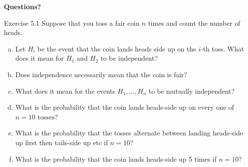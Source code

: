 \documentclass[aspectratio=169,xcolor=pdftex,dvipsnames,table]{beamer}\usepackage[]{graphicx}\usepackage[]{xcolor}
\begin{document}
\begin{frame}
  \begin{center}
    \Large{\textbf{Questions?}}
  \end{center}
\end{frame}

\begin{frame}{Exercise 5.1}
  Suppose that you toss a fair coin $n$ times and count the number of heads.

  \medskip

  \begin{enumerate}[a)]
  \item Let $H_i$ be the event that the coin lands heads side up on the $i$-th toss. What does it mean for $H_1$ and $H_2$ to be independent?
  \item Does independence necessarily mean that the coin is fair?
  \item What does it mean for the events $H_1,\ldots,H_n$ to be mutually independent?
  \item What is the probability that the coin lands heads-side up on every one of $n=10$ tosses?
  \item What is the probability that the tosses alternate between landing heads-side up first then tails-side up etc if $n=10$?
  \item What is the probability that the coin lands heads-side up 5 times if $n=10$?
  \end{enumerate}
\end{frame}
\end{document}
